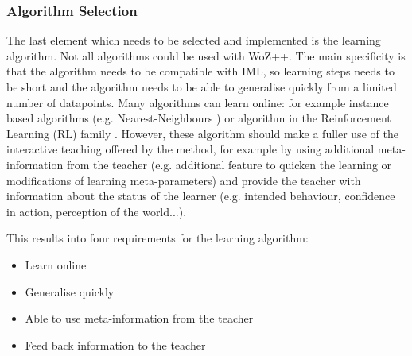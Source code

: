 \documentclass[manuscript, review, anonymous]{acmart}
\newcommand{\ES}[1]{\added[id=ES]{#1}}
\newcommand{\woz}{WoZ++\xspace}
\begin{document}
\subsubsection{Algorithm Selection}\label{sec:algo}

The last element which needs to be selected and implemented is the learning 
algorithm.
Not all algorithms could be used with \woz. The main specificity is that the
algorithm needs to be compatible with IML, so learning steps needs to be short 
and the algorithm needs to be able to generalise quickly from a limited number 
of datapoints. Many algorithms can learn online: for example 
instance based algorithms (e.g. Nearest-Neighbours \cite{cover1967nearest}) or 
algorithm in the Reinforcement Learning (RL) family \cite{sutton1998reinforcement}.
However, these algorithm should make a fuller use of the interactive teaching 
offered by the method, for example by using additional meta-information from the 
teacher (e.g. additional feature to quicken the learning or modifications of learning meta-parameters) and provide the teacher with information about the status of the learner
(e.g. intended behaviour, confidence in action, perception of the
world...).

This results into four requirements for the learning algorithm:
\begin{itemize}
    \item Learn online
    \item Generalise quickly 
    \item Able to use meta-information from  the teacher
    \item Feed back information to the teacher
\end{itemize}
\end{document}
